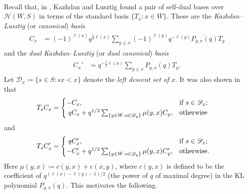 \noindent\\ Recall that, in \cite{KL79}, Kazhdan and Lusztig found a pair of self-dual bases over $\mathscr{H}(W, S)$ in terms of the standard basis $\{T_x : x \in W\}$. These are the {\em Kazhdan--Lusztig} (or {\em canonical}) {\em basis}
\begin{align*}
\begin{split}
C_x &= (-1)^{\ell(x)}q^{\frac{1}{2}\ell(x)}\sum_{y \leq x} (-1)^{\ell(y)}q^{-\ell(y)}\overline{P_{y,x}(q)} T_y
\end{split}
\end{align*}
\noindent and the {\em dual Kazhdan--Lusztig} (or {\em dual canonical}) {\em basis}
\begin{align*}
\begin{split}
C_x' &= q^{-\frac{1}{2}\ell(x)}\sum_{y \leq x} P_{y,x}(q) T_y.
\end{split}
\end{align*}
\noindent Let $\mathscr{D}_x \coloneqq \{s \in S : sx < x\}$ denote the {\em left descent set of $x$}. It was also shown in \cite{KL79} that
\begin{align*}
\begin{split}
T_sC_x &= \begin{cases}
-C_x, &\text{if $s \in \mathscr{D}_x$;}\\
\nhphantom{$q$}\hphantom{-}qC_x + q^{1/2}\sum_{\{y \in W : s \in \mathscr{D}_y\}} \mu(y, x)C_y, &\text{otherwise}\hphantom{.}
\end{cases}
\end{split}
\end{align*}
\noindent and
\begin{align*}
\begin{split}
T_sC_x' &= \begin{cases}
\nhphantom{$q$}\hphantom{-}qC_x', &\text{if $s \in \mathscr{D}_x$;}\\
-C_x' + q^{1/2}\sum_{\{y \in W : s \in \mathscr{D}_y\}} \mu(y, x)C_y', &\text{otherwise.}
\end{cases}
\end{split}
\end{align*}
\noindent Here $\mu(y, x) \coloneqq c(y, x) + c(x, y)$, where $c(y, x)$ is defined to be the coefficient of $q^{(\ell(x)-\ell(y)-1)/2}$ (the power of $q$ of maximal degree) in the KL polynomial $P_{y,x}(q)$. This motivates the following.\\

